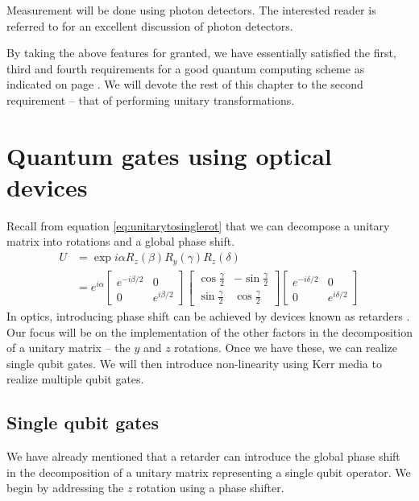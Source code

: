 Measurement will be done using photon detectors. The interested reader is referred to \cite{foxqoptics} for an excellent discussion of photon detectors.

By taking the above features for granted, we have essentially satisfied the first, third and fourth requirements for a good quantum computing scheme as indicated on page \pageref{requirements}. We will devote the rest of this chapter to the second requirement -- that of performing unitary transformations.

\section{Quantum gates using optical devices}
Recall from equation \eqref{eq:unitarytosinglerot} that we can decompose a unitary matrix into rotations and a global phase shift. 
\begin{align}
U &= \exp{i\alpha}R_z(\beta)R_y(\gamma)R_z(\delta)\\ 
&= e^{i\alpha}\left[\begin{array}{cc}e^{-i\beta/2} & 0\\
0 & e^{i\beta/2}\end{array}\right]
\left[\begin{array}{cc}\cos\frac{\gamma}{2} & -\sin\frac{\gamma}{2}\\
\sin\frac{\gamma}{2} & \cos\frac{\gamma}{2}\end{array}\right] 
\left[\begin{array}{cc}e^{-i\delta/2} & 0\\
0 & e^{i\delta/2}\end{array}\right]
\end{align}
In optics, introducing phase shift can be achieved by devices known as retarders \cite{hechtoptics}. Our focus will be on the implementation of the other factors in the decomposition of a unitary matrix -- the $y$ and $z$ rotations. Once we have these, we can realize single qubit gates. We will then introduce non-linearity using Kerr media to realize multiple qubit gates.

\subsection{Single qubit gates}
We have already mentioned that a retarder can introduce the global phase shift in the decomposition of a unitary matrix representing a single qubit operator. We begin by addressing the $z$ rotation using a phase shifter.

